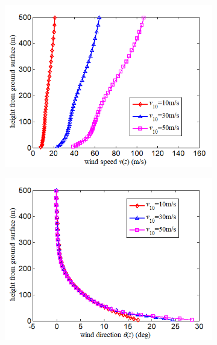 \documentclass[12pt,a4paper]{article}
\begin{document}
\begin{figure}[!ht]
    \begin{subfigure}{0.3\textwidth}
        \includegraphics[width=\linewidth]{figures/fig_a.png}
        \caption{}
    \end{subfigure}
    \hfill
    \begin{subfigure}{0.3\textwidth}
        \includegraphics[width=\linewidth]{figures/fig_b.png}
        \caption{}
    \end{subfigure}
    \hfill
    \begin{subfigure}{0.3\textwidth}

\end{subfigure}
\end{figure}
\end{document}
